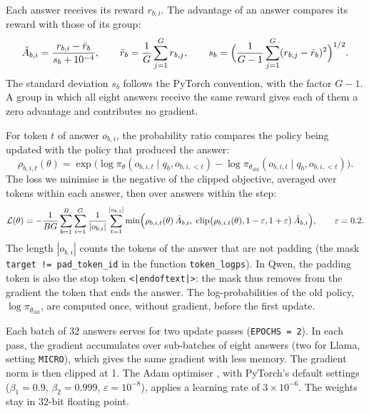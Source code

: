 Each answer receives its reward $r_{b,i}$. The advantage of an answer compares its reward with those of
its group:
\begin{equation}
  \hat A_{b,i} = \frac{r_{b,i} - \bar r_b}{s_b + 10^{-4}}, \qquad
  \bar r_b = \frac1G \sum_{j=1}^{G} r_{b,j}, \qquad
  s_b = \Bigl(\frac{1}{G-1}\sum_{j=1}^{G} (r_{b,j} - \bar r_b)^2\Bigr)^{1/2}.
\end{equation}
The standard deviation $s_b$ follows the PyTorch convention, with the factor $G-1$. A group in which
all eight answers receive the same reward gives each of them a zero advantage and contributes no
gradient.

For token $t$ of answer $o_{b,i}$, the probability ratio compares the policy being updated with the
policy that produced the answer:
\begin{equation}
  \rho_{b,i,t}(\theta) = \exp\bigl(\log \pi_\theta(o_{b,i,t} \mid q_b, o_{b,i,<t})
    - \log \pi_{\theta_{\text{old}}}(o_{b,i,t} \mid q_b, o_{b,i,<t})\bigr).
\end{equation}
The loss we minimise is the negative of the clipped objective, averaged over tokens within each
answer, then over answers within the step:
\begin{equation}
  \mathcal L(\theta) = -\frac{1}{BG} \sum_{b=1}^{B} \sum_{i=1}^{G} \frac{1}{|o_{b,i}|}
  \sum_{t=1}^{|o_{b,i}|} \min\Bigl(\rho_{b,i,t}(\theta)\,\hat A_{b,i},\;
  \operatorname{clip}\bigl(\rho_{b,i,t}(\theta), 1-\varepsilon, 1+\varepsilon\bigr)\,\hat A_{b,i}\Bigr),
  \qquad \varepsilon = 0.2.
  \label{eq:grpo}
\end{equation}
The length $|o_{b,i}|$ counts the tokens of the answer that are not padding (the mask
\texttt{target != pad\_token\_id} in the function \texttt{token\_logps}). In Qwen, the padding token is
also the stop token \texttt{<|endoftext|>}: the mask thus removes from the gradient the token that ends
the answer. The log-probabilities of the old policy, $\log \pi_{\theta_{\text{old}}}$,
are computed once, without gradient, before the first update.

Each batch of 32 answers serves for two update passes (\texttt{EPOCHS = 2}). In each pass, the
gradient accumulates over sub-batches of eight answers (two for Llama, setting \texttt{MICRO}), which
gives the same gradient with less memory. The gradient norm is then clipped at 1. The Adam
optimiser \parencite{kingma2015adam}, with PyTorch's default settings ($\beta_1 = 0.9$,
$\beta_2 = 0.999$, $\varepsilon = 10^{-8}$), applies a learning rate of $3 \times 10^{-6}$. The weights
stay in 32-bit floating point.

